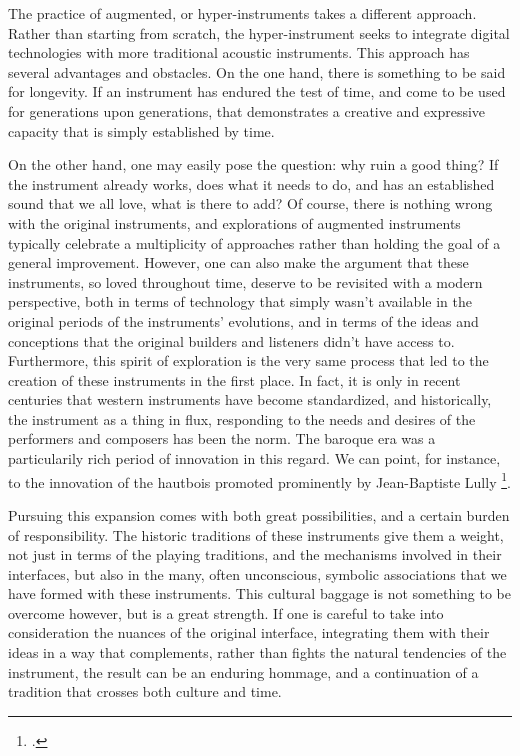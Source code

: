 \documentclass[12pt,twoside,maitrise]{dms_ks}
\theoremstyle{definition}
\begin{document}
The practice of augmented, or hyper-instruments takes a different approach. 
Rather than starting from scratch, the hyper-instrument seeks to integrate digital technologies with more traditional acoustic instruments. 
This approach has several advantages and obstacles. 
On the one hand, there is something to be said for longevity.
If an instrument has endured the test of time, and come to be used for generations upon generations, that demonstrates a creative and expressive capacity that is simply established by time.

On the other hand, one may easily pose the question: why ruin a good thing?
If the instrument already works, does what it needs to do, and has an established sound that we all love, what is there to add?
Of course, there is nothing wrong with the original instruments, and explorations of augmented instruments typically celebrate a multiplicity of approaches rather than holding the goal of a general improvement.
However, one can also make the argument that these instruments, so loved throughout time, deserve to be revisited with a modern perspective, both in terms of technology that simply wasn't available in the original periods of the instruments' evolutions, and in terms of the ideas and conceptions that the original builders and listeners didn't have access to. Furthermore, this spirit of exploration is the very same process that led to the creation of these instruments in the first place.
In fact, it is only in recent centuries that western instruments have become standardized, and historically, the instrument as a thing in flux, responding to the needs and desires of the performers and composers has been the norm.
The baroque era was a particularily rich period of innovation in this regard.
We can point, for instance, to the innovation of the hautbois promoted prominently by Jean-Baptiste Lully \footcite{wainwright_renaissance_2017}.

Pursuing this expansion comes with both great possibilities, and a certain burden of responsibility.
The historic traditions of these instruments give them a weight, not just in terms of the playing traditions, and the mechanisms involved in their interfaces, but also in the many, often unconscious, symbolic associations that we have formed with these instruments.
This cultural baggage is not something to be overcome however, but is a great strength.
If one is careful to take into consideration the nuances of the original interface, integrating them with their ideas in a way that complements, rather than fights the natural tendencies of the instrument, the result can be an enduring hommage, and a continuation of a tradition that crosses both culture and time.
\end{document}
